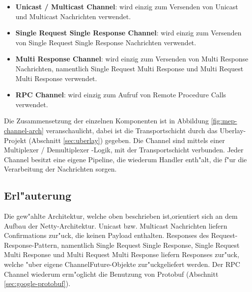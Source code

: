 \begin{itemize}
\item {\bf Unicast / Multicast Channel}: wird einzig zum Versenden von Unicast und Multicast Nachrichten verwendet.
\item {\bf Single Request Single Response Channel}: wird einzig zum Versenden von Single Request Single Response Nachrichten verwendet.
\item {\bf Multi Response Channel}: wird einzig zum Versenden von Multi Response Nachrichten, namentlich Single Request Multi Response und Multi Request Multi Response verwendet.
\item {\bf RPC Channel}: wird einzig zum Aufruf von Remote Procedure Calls verwendet.
\end{itemize}


Die Zusammensetzung der einzelnen Komponenten ist in Abbildung \ref{fig:mep-channel-arch} veranschaulicht, dabei ist die Transportschicht durch das Uberlay-Projekt (Abschnitt \ref{sec:uberlay}) gegeben. Die Channel sind mittels einer Multiplexer / Demultiplexer -Logik, mit der Transportschicht verbunden. Jeder Channel besitzt eine eigene Pipeline, die wiederum Handler enth"alt, die f"ur die Verarbeitung der Nachrichten sorgen. 

\subsection{Erl"auterung}
Die gew"ahlte Architektur, welche oben beschrieben ist,orientiert sich an dem Aufbau der Netty-Architektur. Unicast bzw. Multicast Nachrichten liefern Confirmations zur"uck, die keinen Payload enthalten. Responses des Request-Response-Pattern, namentlich Single Request Single Response, Single Request Multi Response und Multi Request Multi Response liefern Responses zur"uck, welche "uber eigene ChannelFuture-Objekte zur"uckgeliefert werden. Der RPC Channel wiederum erm"oglicht die Benutzung von Protobuf (Abschnitt \ref{sec:google-protobuf}).

